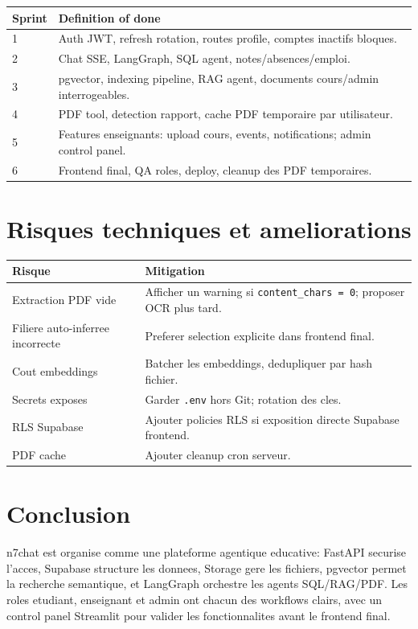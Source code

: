 \documentclass[11pt,a4paper]{article}
\begin{document}
\begin{longtable}{p{2cm}p{12cm}}
\toprule
\textbf{Sprint} & \textbf{Definition of done}\\
\midrule
1 & Auth JWT, refresh rotation, routes profile, comptes inactifs bloques.\\
2 & Chat SSE, LangGraph, SQL agent, notes/absences/emploi.\\
3 & pgvector, indexing pipeline, RAG agent, documents cours/admin interrogeables.\\
4 & PDF tool, detection rapport, cache PDF temporaire par utilisateur.\\
5 & Features enseignants: upload cours, events, notifications; admin control panel.\\
6 & Frontend final, QA roles, deploy, cleanup des PDF temporaires.\\
\bottomrule
\end{longtable}

\section{Risques techniques et ameliorations}

\begin{longtable}{p{4cm}p{10cm}}
\toprule
\textbf{Risque} & \textbf{Mitigation}\\
\midrule
Extraction PDF vide & Afficher un warning si \texttt{content\_chars = 0}; proposer OCR plus tard.\\
Filiere auto-inferree incorrecte & Preferer selection explicite dans frontend final.\\
Cout embeddings & Batcher les embeddings, dedupliquer par hash fichier.\\
Secrets exposes & Garder \texttt{.env} hors Git; rotation des cles.\\
RLS Supabase & Ajouter policies RLS si exposition directe Supabase frontend.\\
PDF cache & Ajouter cleanup cron serveur.\\
\bottomrule
\end{longtable}

\section{Conclusion}

n7chat est organise comme une plateforme agentique educative: FastAPI securise l'acces, Supabase structure les donnees, Storage gere les fichiers, pgvector permet la recherche semantique, et LangGraph orchestre les agents SQL/RAG/PDF. Les roles etudiant, enseignant et admin ont chacun des workflows clairs, avec un control panel Streamlit pour valider les fonctionnalites avant le frontend final.
\end{document}
